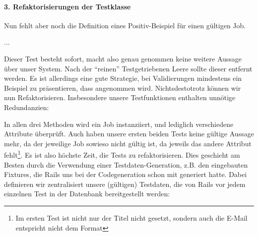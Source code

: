 \paragraph{3. Refaktorisierungen der Testklasse}
Nun fehlt aber noch die Definition eines Positiv-Beispiel für einen gültigen Job.

\begin{ruby}[label=test/unit/job\_test.rb]
...
  
          
   
\end{ruby}
\tddgreen
Dieser Test besteht sofort, macht also genau genommen keine weitere Aussage über unser System. Nach der "`reinen"' Testgetriebenen Leere sollte dieser entfernt werden. Es ist allerdings eine gute Strategie, bei Validierungen mindestens ein Beispiel zu präsentieren, dass angenommen wird. Nichtsdestotrotz können wir nun Refaktorisieren. Insbesondere unsere Testfunktionen enthalten unnötige Redundanzien:

\begin{ruby}[label=test/unit/job\_test.rb]
  
       
   
  
       
   
  
          
   
\end{ruby}
\tddrefactor
In allen drei Methoden wird ein Job instanziiert, und lediglich verschiedene Attribute überprüft. Auch haben unsere ersten beiden Tests keine gültige Aussage mehr, da der jeweilige Job sowieso nicht gültig ist, da jeweils das andere Attribut fehlt\footnote{Im ersten Test ist nicht nur der Titel nicht gesetzt, sondern auch die E-Mail entspricht nicht dem Format}. Es ist also höchste Zeit, die Tests zu refaktorisieren. Dies geschieht am Besten durch die Verwendung einer Testdaten-Generation, z.B. den eingebauten Fixtures, die Rails uns bei der Codegeneration schon mit generiert hatte. Dabei definieren wir zentralisiert unsere (gültigen) Testdaten, die von Rails vor jedem einzelnen Test in der Datenbank bereitgestellt werden:

